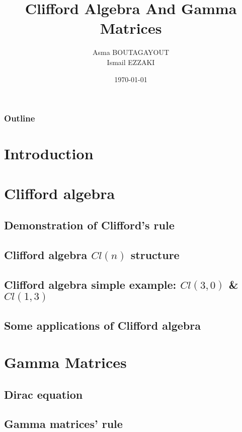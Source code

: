 \documentclass[serif,11pt]{beamer}
\title[ \hspace{0.8cm} \insertframenumber/\inserttotalframenumber]{{\sc Clifford Algebra And Gamma Matrices }}
\author{{Asma BOUTAGAYOUT \\ Ismail EZZAKI}}
\date  {\today}
\institute{University Cadi Ayyad \\Faculty of Sciences Semlalia \\ Physics Departement}
\begin{document}
\begin{frame}
  \begin{center}
    \vspace{0.1cm}
  \end{center}
\titlepage
\end{frame}

\begin{frame}
  \frametitle{Outline}
	\tableofcontents
\end{frame}

\section{Introduction}




\section{Clifford algebra}

\subsection{Demonstration of Clifford’s rule}

\subsection{Clifford algebra $Cl(n)$ structure}

\subsection{Clifford algebra simple example: $Cl(3,0)$ \& $Cl(1,3)$ }

\subsection{Some applications of Clifford algebra}

\section{ Gamma Matrices}
\subsection{Dirac equation}

\subsection{Gamma matrices’ rule}

\end{document}
